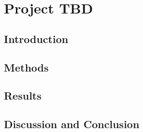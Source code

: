 \section{Project TBD}

\subsection{Introduction}

\subsection{Methods}

\subsection{Results}

\subsection{Discussion and Conclusion}